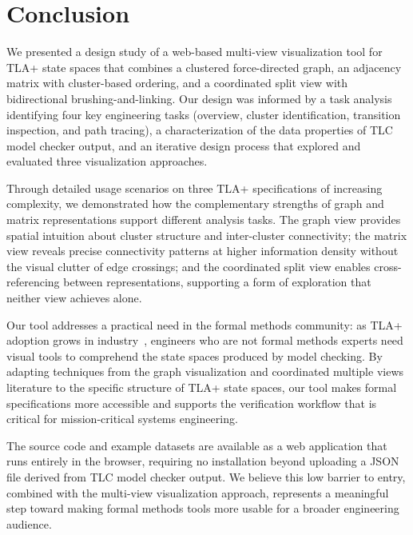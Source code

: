 \documentclass[conference]{IEEEtran}
\begin{document}
\section{Conclusion}
\label{sec:conclusion}

We presented a design study of a web-based multi-view visualization tool for TLA+ state spaces that combines a clustered force-directed graph, an adjacency matrix with cluster-based ordering, and a coordinated split view with bidirectional brushing-and-linking. Our design was informed by a task analysis identifying four key engineering tasks (overview, cluster identification, transition inspection, and path tracing), a characterization of the data properties of TLC model checker output, and an iterative design process that explored and evaluated three visualization approaches.

Through detailed usage scenarios on three TLA+ specifications of increasing complexity, we demonstrated how the complementary strengths of graph and matrix representations support different analysis tasks. The graph view provides spatial intuition about cluster structure and inter-cluster connectivity; the matrix view reveals precise connectivity patterns at higher information density without the visual clutter of edge crossings; and the coordinated split view enables cross-referencing between representations, supporting a form of exploration that neither view achieves alone.

Our tool addresses a practical need in the formal methods community: as TLA+ adoption grows in industry~\cite{newcombe2015amazon, resch2017tla}, engineers who are not formal methods experts need visual tools to comprehend the state spaces produced by model checking. By adapting techniques from the graph visualization and coordinated multiple views literature to the specific structure of TLA+ state spaces, our tool makes formal specifications more accessible and supports the verification workflow that is critical for mission-critical systems engineering.

The source code and example datasets are available as a web application that runs entirely in the browser, requiring no installation beyond uploading a JSON file derived from TLC model checker output. We believe this low barrier to entry, combined with the multi-view visualization approach, represents a meaningful step toward making formal methods tools more usable for a broader engineering audience.

\balance



\end{document}
